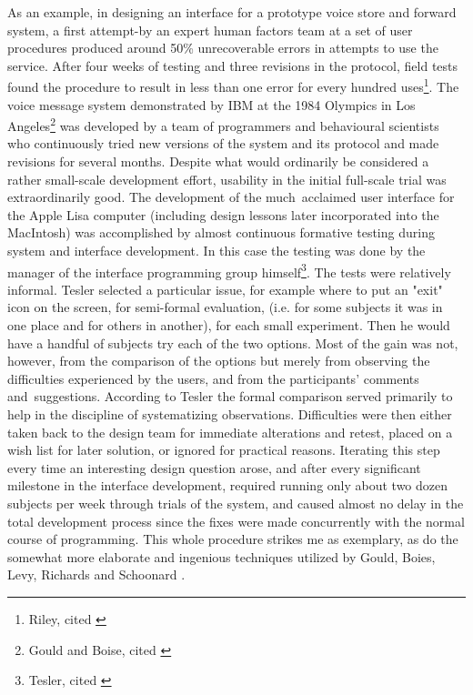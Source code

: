 As an example, in designing an interface for a prototype voice store and forward system, a first attempt-by an expert human factors team at a set of user procedures produced around 50\% unrecoverable errors in attempts to use the service. After four weeks of testing and three revisions in the protocol, field tests found the procedure to result in less than one error for every hundred uses\footnote{Riley, cited \parencite{Cox2008}}. The voice message system demonstrated by IBM at the 1984 Olympics in Los Angeles\footnote{Gould and Boise, cited \parencite{Cox2008}} was developed by a team of programmers and behavioural scientists who continuously tried new versions of the system and its protocol and made revisions for several months. Despite what would ordinarily be considered a rather small-scale development effort, usability in the initial full-scale trial was extraordinarily good. The development of the much acclaimed user interface for the Apple Lisa computer (including design lessons later incorporated into the MacIntosh) was accomplished by almost continuous formative testing during system and interface development. In this case the testing was done by the manager of the interface programming group himself\footnote{Tesler, cited \parencite{Cox2008}}. The tests were relatively informal. Tesler selected a particular issue, for example where to put an "exit" icon on the screen, for semi-formal evaluation, (i.e. for some subjects it was in one place and for others in another), for each small experiment. Then he would have a handful of subjects try each of the two options. Most of the gain was not, however, from the comparison of the options but merely from observing the difficulties experienced by the users, and from the participants' comments and suggestions. According to Tesler the formal comparison served primarily to help in the discipline of systematizing observations. Difficulties were then either taken back to the design team for immediate alterations and retest, placed on a wish list for later solution, or ignored for practical reasons. Iterating this step every time an interesting design question arose, and after every significant milestone in the interface development, required running only about two dozen subjects per week through trials of the system, and caused almost no delay in the total development process since the fixes were made concurrently with the normal course of programming. This whole procedure strikes me as exemplary, as do the somewhat more elaborate and ingenious techniques utilized by Gould, Boies, Levy, Richards and Schoonard \parencite{Cox2008}.

